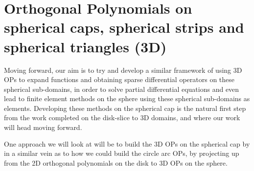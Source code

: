 \documentclass[11pt, oneside]{article}   	%
\begin{document}



\section{Orthogonal Polynomials on spherical caps, spherical strips and spherical triangles (3D)}

Moving forward, our aim is to try and develop a similar framework of using 3D OPs to expand functions and obtaining sparse differential operators on these spherical sub-domains, in order to solve partial differential equations and even lead to finite element methods on the sphere using these spherical sub-domains as elements. Developing these methods on the spherical cap is the natural first step from the work completed on the disk-slice to 3D domains, and where our work will head moving forward.

One approach we will look at will be to build the 3D OPs on the spherical cap by in a similar vein as to how we could build the circle arc OPs, by projecting up from the 2D orthogonal polynomials on the disk to 3D OPs on the sphere. 
\end{document}
